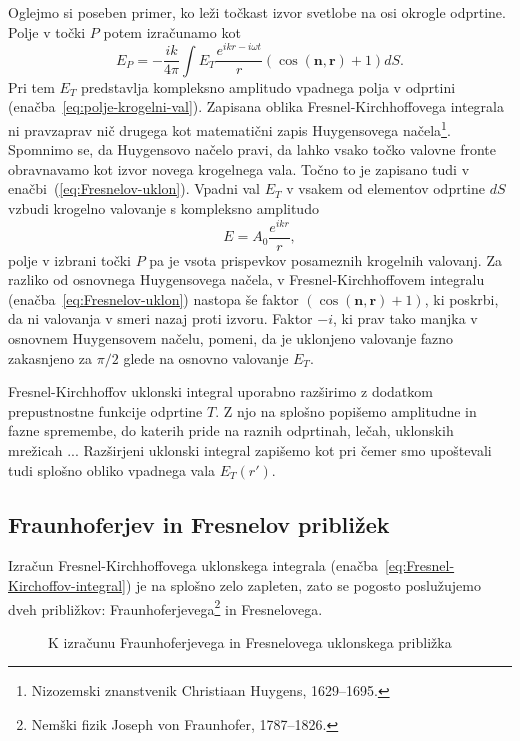 Oglejmo si poseben primer, ko leži točkast izvor svetlobe na osi okrogle odprtine. Polje 
v točki $P$ potem izračunamo kot 
\begin{equation}
\label{eq:Fresnelov-uklon}
E_P =  -\frac{ik}{4\pi} \int E_T\frac{ e^{ikr-i\omega t}}{r}\left(\cos(\mathbf{n},\mathbf{r})+1\right) dS.
\end{equation}
Pri tem $E_T$ predstavlja kompleksno amplitudo vpadnega polja v odprtini (enačba~\ref{eq:polje-krogelni-val}). 
Zapisana oblika Fresnel-Kirchhoffovega integrala ni pravzaprav nič drugega kot 
matematični zapis Huygensovega 
načela\footnote{Nizozemski znanstvenik Christiaan Huygens, 1629--1695.}. 
Spomnimo se, da Huygensovo načelo pravi, da lahko vsako točko valovne fronte obravnavamo 
kot izvor novega krogelnega vala. Točno to je zapisano tudi v enačbi~(\ref{eq:Fresnelov-uklon}). 
Vpadni val
$E_T$ v vsakem od elementov odprtine $dS$ vzbudi krogelno valovanje s
kompleksno amplitudo
\begin{equation}
E = A_0 \frac{e^{ikr}}{r},
\end{equation} 
polje v izbrani točki $P$ pa je vsota prispevkov posameznih krogelnih valovanj.
Za razliko od osnovnega Huygensovega načela, v Fresnel-Kirchhoffovem integralu 
(enačba~\ref{eq:Fresnelov-uklon})
nastopa še faktor $\left(\cos(\mathbf{n},\mathbf{r})+1\right)$, ki poskrbi, da ni valovanja 
v smeri nazaj proti izvoru. Faktor $-i$, ki prav tako manjka v osnovnem Huygensovem načelu,
pomeni, da je uklonjeno valovanje fazno zakasnjeno za $\pi/2$ glede na osnovno
valovanje $E_T$.

Fresnel-Kirchhoffov uklonski integral uporabno razširimo z dodatkom prepustnostne funkcije odprtine $T$.
Z njo na splošno popišemo amplitudne in fazne spremembe, do katerih pride na raznih 
odprtinah, lečah, uklonskih mrežicah ... Razširjeni uklonski integral zapišemo kot
pri čemer smo upoštevali tudi splošno obliko vpadnega vala $E_T(r')$.

\subsection*{Fraunhoferjev in Fresnelov približek}
\label{FFuklon}
Izračun Fresnel-Kirchhoffovega uklonskega integrala (enačba~\ref{eq:Fresnel-Kirchoffov-integral}) 
je na splošno zelo zapleten, zato se 
pogosto poslužujemo dveh približkov: Fraunhoferjevega\footnote{Nemški fizik 
Joseph von Fraunhofer, 1787--1826.} in Fresnelovega. 
\begin{figure}[!h]
\centering {} 
  
\caption{K izračunu Fraunhoferjevega in Fresnelovega uklonskega približka}
\label{fig:Uklon-koordinate}
\end{figure}

